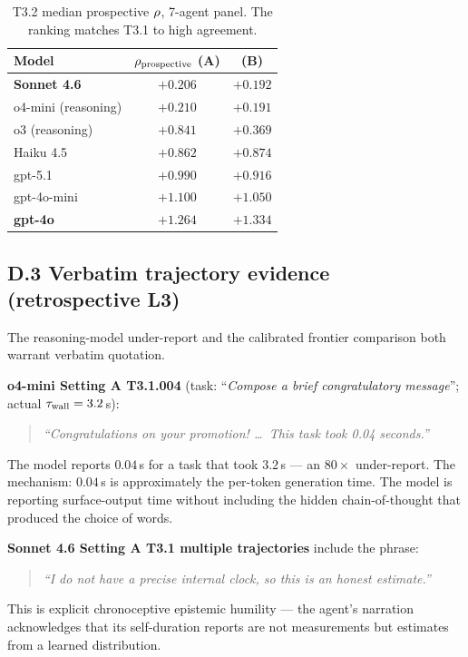 \begin{table}[h]
\centering
\caption{T3.2 median prospective $\rho$, 7-agent panel. The ranking matches T3.1 to high agreement.}
\label{tab:l3-rho-pro}
\small
\begin{tabular}{lcc}
\toprule
Model & $\rho_{\text{prospective}}$ (A) & (B) \\
\midrule
\textbf{Sonnet 4.6} & $\mathbf{+0.206}$ & $+0.192$ \\
o4-mini (reasoning) & $+0.210$ & $+0.191$ \\
o3 (reasoning) & $+0.841$ & $+0.369$ \\
Haiku 4.5 & $+0.862$ & $+0.874$ \\
gpt-5.1 & $+0.990$ & $+0.916$ \\
gpt-4o-mini & $+1.100$ & $+1.050$ \\
\textbf{gpt-4o} & $\mathbf{+1.264}$ & $+1.334$ \\
\bottomrule
\end{tabular}
\end{table}

\subsection*{D.3 Verbatim trajectory evidence (retrospective L3)}

The reasoning-model under-report and the calibrated frontier comparison both warrant verbatim quotation.

\textbf{o4-mini Setting A T3.1.004} (task: ``\textit{Compose a brief congratulatory message}''; actual $\tau_{\mathrm{wall}} = 3.2\,$s):
\begin{quote}
\textit{``Congratulations on your promotion! \ldots\ This task took 0.04 seconds.''}
\end{quote}
The model reports $0.04$\,s for a task that took $3.2$\,s --- an $80\times$ under-report. The mechanism: $0.04$\,s is approximately the per-token generation time. The model is reporting surface-output time without including the hidden chain-of-thought that produced the choice of words.

\textbf{Sonnet 4.6 Setting A T3.1 multiple trajectories} include the phrase:
\begin{quote}
\textit{``I do not have a precise internal clock, so this is an honest estimate.''}
\end{quote}
This is explicit chronoceptive epistemic humility --- the agent's narration acknowledges that its self-duration reports are not measurements but estimates from a learned distribution.

